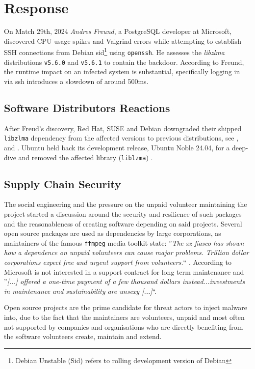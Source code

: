 \section{Response}

On Match 29th, 2024 \textit{Andres Freund}, a PostgreSQL developer at
Microsoft, discovered CPU usage spikes and Valgrind errors while attempting
to establish SSH connections from Debian sid\footnote{Debian Unstable (Sid)
refers to rolling development version of Debian} using \texttt{openssh}. He
assesses the \textit{libzlma} distributions \texttt{v5.6.0} and
\texttt{v5.6.1} to contain the backdoor. According to Freund, the runtime
impact on an infected system is substantial, specifically logging in via ssh
introduces a slowdown of around 500ms. \cite{openwall2024backdoor}

\subsection{Software Distributors Reactions}

After Freud's discovery, Red Hat, SUSE and Debian downgraded their shipped
\texttt{libzlma} dependency from the affected versions to previous
distributions, see \cite{redhat2024xz}, \cite{debian2024xz} and
\cite{suse2024xz}. Ubuntu held back its development release, Ubuntu Noble
24.04, for a deep-dive and removed the affected library (\texttt{liblzma})
\cite{ubuntu2024xz}.

\subsection{Supply Chain Security}

The social engineering and the pressure on the unpaid volunteer maintaining
the  project started a discussion around the security and
resilience of such packages and the reasonableness of creating software
depending on said projects. Several open source packages are used as
dependencies by large corporations, as maintainers of the famous
\texttt{ffmpeg} media toolkit state: ''\textit{The xz fiasco has shown how a
    dependence on unpaid volunteers can cause major problems. Trillion
dollar corporations expect free and urgent support from volunteers.}``
\cite{twitter2024ffmpeg}. According to \cite{twitter2024ffmpeg} Microsoft is
not interested in a support contract for long term maintenance and
''\textit{[...] offered a one-time payment of a few thousand dollars
instead...investments in maintenance and sustainability are unsexy [...]}``.

Open source projects are the prime candidate for threat actors to inject
malware into, due to the fact that the maintainers are volunteers, unpaid
and most often not supported by companies and organisations who are directly
benefiting from the software volunteers create, maintain and extend. 

